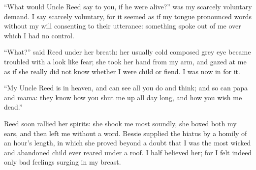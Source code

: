 \enquote{What would Uncle Reed say to you, if he were alive?} was my
scarcely voluntary demand. I say scarcely voluntary, for it seemed as
if my tongue pronounced words without my will consenting to their
utterance: something spoke out of me over which I had no control.

\enquote{What?} said \Mrs{} Reed under her breath: her usually cold
composed grey eye became troubled with a look like fear; she took her
hand from my arm, and gazed at me as if she really did not know whether
I were child or fiend. I was now in for it.

\enquote{My Uncle Reed is in heaven, and can see all you do and think;
and so can papa and mama: they know how you shut me up all day long, and
how you wish me dead.}

\Mrs{} Reed soon rallied her spirits: she shook me most soundly, she boxed
both my ears, and then left me without a word. Bessie supplied the
hiatus by a homily of an hour's length, in which she proved beyond a
doubt that I was the most wicked and abandoned child ever reared under a
roof. I half believed her; for I felt indeed only bad feelings surging
in my breast.

